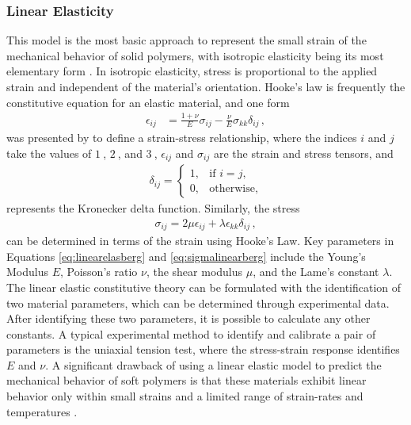 \subsubsection*{Linear Elasticity}
This model is the most basic approach to represent the small strain of the mechanical behavior 
of solid polymers, with isotropic elasticity being its most elementary form \cite{Bergström2015}.
In isotropic elasticity, stress is proportional to the applied strain and independent of the material's 
orientation. Hooke's law is frequently the constitutive equation for an elastic material, and one form 
\begin{align}
        \epsilon_{ij} &= \frac{1 + \nu}{E} \sigma_{ij} - \frac{\nu}{E} \sigma_{kk} \delta_{ij} \, ,
        \label{eq:linearelasberg}
\end{align}  
was presented by \citet{Bergström2015} to define a strain-stress relationship, where the indices $i$ and $j$ take the values of 
$\SI{1}{}$, $\SI{2}{}$, and $\SI{3}{}$, $\epsilon_{ij}$ and $\sigma_{ij}$ are the strain and stress tensors, and
\begin{align}
        \delta_{ij} = \begin{cases} 
                        1, & \text{if } i=j, \\
                        0, & \text{otherwise},
                      \end{cases}
\label{eq:kronecker}
\end{align}
represents the Kronecker delta function. Similarly, the stress 
\begin{align}
        \sigma_{ij} = 2\mu\epsilon_{ij} + \lambda\epsilon_{kk}\delta_{ij} \, ,
        \label{eq:sigmalinearberg}
\end{align}
can be determined in terms of the strain using Hooke's Law. Key parameters in Equations \ref{eq:linearelasberg}
and \ref{eq:sigmalinearberg} include the Young's Modulus $E$, Poisson's ratio $\nu$, the shear modulus $\mu$, 
and the Lame's constant $\lambda$. 
The linear elastic constitutive theory can be formulated with the identification of two material parameters,
which can be determined through experimental data. After identifying these two parameters, it is possible to  
calculate any other constants. A typical experimental method to identify and calibrate a pair of parameters is the uniaxial tension 
test, where the stress-strain response identifies $E$ and $\nu$.
A significant drawback of using a linear elastic model to predict the mechanical behavior of soft polymers is 
that these materials exhibit linear behavior only within small strains and a limited range of strain-rates and 
temperatures \cite{Bergström2015}. 

